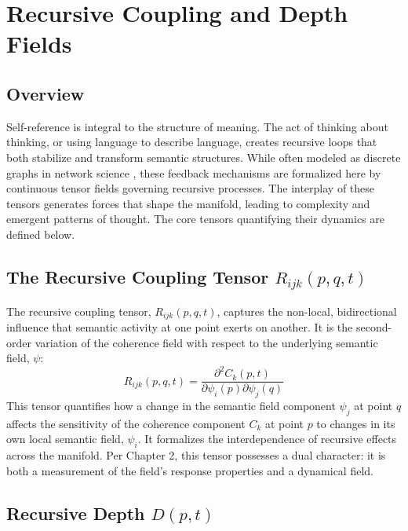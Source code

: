 \chapter{Recursive Coupling and Depth Fields}

\section{Overview}

Self-reference is integral to the structure of meaning. The act of thinking about thinking, or using language to describe language, creates recursive loops that both stabilize and transform semantic structures. While often modeled as discrete graphs in network science \autocite{Barabasi2016}, these feedback mechanisms are formalized here by continuous tensor fields governing recursive processes. The interplay of these tensors generates forces that shape the manifold, leading to complexity and emergent patterns of thought. The core tensors quantifying their dynamics are defined below.

\section{\texorpdfstring{The Recursive Coupling Tensor $R_{ijk}(p, q, t)$}{The Recursive Coupling Tensor R_ijk(p, q, t)}}

The recursive coupling tensor, \(R_{ijk}(p, q, t)\), captures the non-local, bidirectional influence that semantic activity at one point exerts on another. It is the second-order variation of the coherence field with respect to the underlying semantic field, \(\psi\):
\begin{equation}
R_{ijk}(p, q, t) = \frac{\partial^2 C_k(p,t)}{\partial \psi_i(p) \partial \psi_j(q)}
\end{equation}
This tensor quantifies how a change in the semantic field component \(\psi_j\) at point \(q\) affects the sensitivity of the coherence component \(C_k\) at point \(p\) to changes in its own local semantic field, \(\psi_i\). It formalizes the interdependence of recursive effects across the manifold. Per Chapter 2, this tensor possesses a dual character: it is both a measurement of the field's response properties and a dynamical field.

\section{\texorpdfstring{Recursive Depth $D(p, t)$}{Recursive Depth D(p, t)}}

